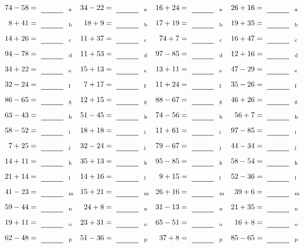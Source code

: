 \documentclass
[
  draft    = true,
  fontsize = 11pt,
  parskip  = half-
]
{scrartcl}
\begin{document}
\clearpage
\begin{align*}
    \pline{74-58}&=\rline{a}
  & \pline{34-22}&=\rline{a}
  & \pline{16+24}&=\rline{a}
  & \pline{26+16}&=\rline{a} \\[1ex]
    \pline{8+41}&=\rline{b}
  & \pline{18+9}&=\rline{b}
  & \pline{17+19}&=\rline{b}
  & \pline{19+35}&=\rline{b} \\[1ex]
    \pline{14+26}&=\rline{c}
  & \pline{11+37}&=\rline{c}
  & \pline{74+7}&=\rline{c}
  & \pline{16+47}&=\rline{c} \\[1ex]
    \pline{94-78}&=\rline{d}
  & \pline{11+53}&=\rline{d}
  & \pline{97-85}&=\rline{d}
  & \pline{12+16}&=\rline{d} \\[1ex]
    \pline{34+22}&=\rline{e}
  & \pline{15+13}&=\rline{e}
  & \pline{13+11}&=\rline{e}
  & \pline{47-29}&=\rline{e} \\[1ex]
    \pline{32-24}&=\rline{f}
  & \pline{7+17}&=\rline{f}
  & \pline{11+24}&=\rline{f}
  & \pline{35-26}&=\rline{f} \\[1ex]
    \pline{86-65}&=\rline{g}
  & \pline{12+15}&=\rline{g}
  & \pline{88-67}&=\rline{g}
  & \pline{46+26}&=\rline{g} \\[1ex]
    \pline{63-43}&=\rline{h}
  & \pline{51-45}&=\rline{h}
  & \pline{74-56}&=\rline{h}
  & \pline{56+7}&=\rline{h} \\[1ex]
    \pline{58-52}&=\rline{i}
  & \pline{18+18}&=\rline{i}
  & \pline{11+61}&=\rline{i}
  & \pline{97-85}&=\rline{i} \\[1ex]
    \pline{7+25}&=\rline{j}
  & \pline{32-24}&=\rline{j}
  & \pline{79-67}&=\rline{j}
  & \pline{44-34}&=\rline{j} \\[1ex]
    \pline{14+11}&=\rline{k}
  & \pline{35+13}&=\rline{k}
  & \pline{95-85}&=\rline{k}
  & \pline{58-54}&=\rline{k} \\[1ex]
    \pline{21+14}&=\rline{l}
  & \pline{14+16}&=\rline{l}
  & \pline{9+15}&=\rline{l}
  & \pline{52-36}&=\rline{l} \\[1ex]
    \pline{41-23}&=\rline{m}
  & \pline{15+21}&=\rline{m}
  & \pline{26+16}&=\rline{m}
  & \pline{39+6}&=\rline{m} \\[1ex]
    \pline{59-44}&=\rline{n}
  & \pline{24+8}&=\rline{n}
  & \pline{31-13}&=\rline{n}
  & \pline{21+35}&=\rline{n} \\[1ex]
    \pline{19+11}&=\rline{o}
  & \pline{23+31}&=\rline{o}
  & \pline{65-51}&=\rline{o}
  & \pline{16+8}&=\rline{o} \\[1ex]
    \pline{62-48}&=\rline{p}
  & \pline{51-36}&=\rline{p}
  & \pline{37+8}&=\rline{p}
  & \pline{85-65}&=\rline{p}
\end{align*}
\end{document}
